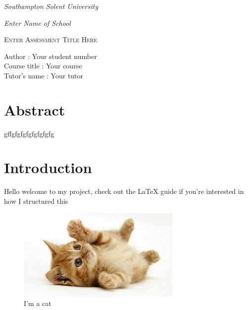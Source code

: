 \documentclass[12pt,a4paper]{article}
\begin{document}
\begin{titlepage}
    {\fontsize{14}{12} \emph{Southampton Solent University}\par}
    {\fontsize{14}{12}  \emph{Enter Name of School} \par}
    \centering
    \vspace{10 cm}
    {\scshape\Huge Enter Assessment Title Here\par}
    \vspace{10cm}
    \begin{flushleft}
        Author \hspace{1.1cm} : Your student number\\
        Course title \hspace{0.29cm} : Your course\\
        Tutor's name \hspace{0.03cm} : Your tutor\\
    \end{flushleft}
\end{titlepage}

\tableofcontents

\clearpage

\listoffigures

\clearpage

\section{Abstract}
gffgfgfgfgfgfgfgfg

\section{Introduction}
Hello welcome to my project, check out the LaTeX guide if you're interested in how I structured this \parencite{latex:guide}

\begin{figure}[h!]
    \centering
    \includegraphics{assets/cat.jpeg}
    \caption{I'm a cat}
    \label{fig:cat}
\end{figure}
\end{document}
